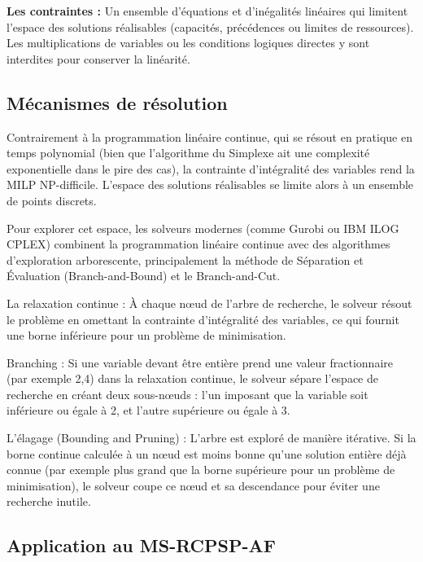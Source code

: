 \noindent\textbf{Les contraintes :} Un ensemble d'équations et d'inégalités linéaires qui limitent l'espace des solutions réalisables (capacités, précédences ou limites de ressources). Les multiplications de variables ou les conditions logiques directes y sont interdites pour conserver la linéarité.
\bigskip

\subsection{Mécanismes de résolution} Contrairement à la programmation linéaire continue, qui se résout en pratique en temps polynomial (bien que l'algorithme du Simplexe ait une complexité exponentielle dans le pire des cas), la contrainte d'intégralité des variables rend la MILP NP-difficile. L'espace des solutions réalisables se limite alors à un ensemble de points discrets.

\bigskip

Pour explorer cet espace, les solveurs modernes (comme Gurobi ou IBM ILOG CPLEX) combinent la programmation linéaire continue avec des algorithmes d'exploration arborescente, principalement la méthode de Séparation et Évaluation (Branch-and-Bound) et le Branch-and-Cut.

\bigskip

La relaxation continue : À chaque nœud de l'arbre de recherche, le solveur résout le problème en omettant la contrainte d'intégralité des variables, ce qui fournit une borne inférieure pour un problème de minimisation.

\bigskip

Branching : Si une variable devant être entière prend une valeur fractionnaire (par exemple 2,4) dans la relaxation continue, le solveur sépare l'espace de recherche en créant deux sous-nœuds : l'un imposant que la variable soit inférieure ou égale à 2, et l'autre supérieure ou égale à 3.

\bigskip

L'élagage (Bounding and Pruning) : L'arbre est exploré de manière itérative. Si la borne continue calculée à un nœud est moins bonne qu'une solution entière déjà connue (par exemple plus grand que la borne supérieure pour un problème de minimisation), le solveur coupe ce nœud et sa descendance pour éviter une recherche inutile.

\subsection{Application au MS-RCPSP-AF}


